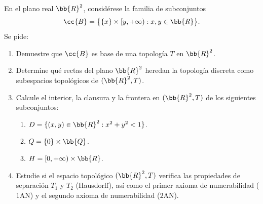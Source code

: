 \documentclass[12pt]{article}
\begin{document}
    \begin{ejercicio}
    En el plano real $\bb{R}^2$, considérese la familia de subconjuntos
    \[
        \cc{B} = \big\{ \{x\} \times [y, +\infty) : x, y \in \bb{R} \big\}.
    \]
    Se pide:
    \begin{enumerate}[label=\alph*)]
        \item Demuestre que $\cc{B}$ es base de una topología $T$ en $\bb{R}^2$.
        
        \item Determine qué rectas del plano $\bb{R}^2$ heredan la topología discreta como subespacios topológicos de $(\bb{R}^2, T)$.
        
        \item Calcule el interior, la clausura y la frontera en $(\bb{R}^2, T)$ de los siguientes subconjuntos:
        \begin{enumerate}[label=\roman*)]
            \item $D = \{ (x, y) \in \bb{R}^2 : x^2 + y^2 < 1 \}$.
            \item $Q = \{0\} \times \bb{Q}$.
            \item $H = [0, +\infty) \times \bb{R}$.
        \end{enumerate}
        
        \item Estudie si el espacio topológico $(\bb{R}^2, T)$ verifica las propiedades de separación $T_1$ y $T_2$ (Hausdorff), así como el primer axioma de numerabilidad ($1\mathrm{AN}$) y el segundo axioma de numerabilidad ($2\mathrm{AN}$).
    \end{enumerate}
    \end{ejercicio}
\end{document}
